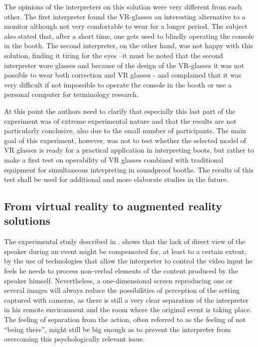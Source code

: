 \documentclass[output=paper]{langsci/langscibook}
\begin{document}
The opinions of the interpreters on this solution were very different from each other. The first interpreter found the \textsc{VR}-glasses an interesting alternative to a monitor although not very comfortable to wear for a longer period. The subject also stated that, after a short time, one gets used to blindly operating the console in the booth. The second interpreter, on the other hand, was not happy with this solution, finding it tiring for the eyes –it must be noted that the second interpreter wore glasses and because of the design of the \textsc{VR}-glasses it was not possible to wear both correction and \textsc{VR} glasses - and complained that it was very difficult if not impossible to operate the console in the booth or use a personal computer for terminology research.

At this point the authors need to clarify that especially this last part of the experiment was of extreme experimental nature and that the results are not particularly conclusive, also due to the small number of participants. The main goal of this experiment, however, was not to test whether the selected model of \textsc{VR} glasses is ready for a practical application in interpreting boots, but rather to make a first test on operability of \textsc{VR} glasses combined with traditional equipment for simultaneous interpreting in soundproof booths. The results of this test shall be used for additional and more elaborate studies in the future.

\subsection{From virtual reality to augmented reality solutions}

The experimental study described in . shows that the lack of direct view of the speaker during an event might be compensated for, at least to a certain extent, by the use of technologies that allow the interpreter to control the video input he feels he needs to process non-verbal elements of the content produced by the speaker himself. Nevertheless, a one-dimensional screen reproducing one or several images will always reduce the possibilities of perception of the setting captured with cameras, as there is still a very clear separation of the interpreter in his remote environment and the room where the original event is taking place. The feeling of separation from the action, often referred to as the feeling of not “being there”, might still be big enough as to prevent the interpreter from overcoming this psychologically relevant issue. 
\end{document}
